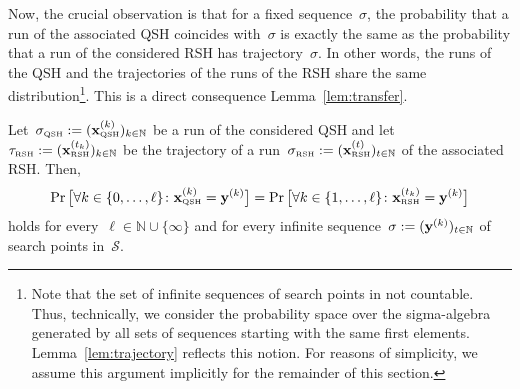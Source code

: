 \documentclass[a4paper,11pt]{article}
\begin{document}
Now, the crucial observation is that for a fixed sequence~$\sigma$, the probability that a run of the associated QSH coincides with~$\sigma$ is exactly the same as the probability that a run of the considered RSH has trajectory~$\sigma$. In other words, the runs of the QSH and the trajectories of the runs of the RSH share the same distribution\footnote{Note that the set of infinite sequences of search points in not countable. Thus, technically, we consider the probability space over the sigma-algebra generated by all sets of sequences starting with the same first elements. Lemma~\ref{lem:trajectory} reflects this notion. For reasons of simplicity, we assume this argument implicitly for the remainder of this section.}. This is a direct consequence Lemma~\ref{lem:transfer}. 

\begin{lemma}\label{lem:trajectory}
Let~$\sigma_\QSH:=(\xvec[k]_\QSH)_{k\in\mathbb{N}}$ be a run of the considered QSH and let~$\tau_\RSH:=(\xvec[t_k]_\RSH)_{k\in\mathbb{N}}$ be the trajectory of a run~$\sigma_\RSH:=(\xvec[t]_\RSH)_{t\in\mathbb{N}}$ of the associated RSH. Then,
\begin{equation*}
\Pr\big[\forall k\in\{0,\dots,\ell\}\colon\xvec[k]_\QSH=\yvec[k]\big]=\Pr\big[\forall k\in\{1,\dots,\ell\}\colon\xvec[t_k]_\RSH=\yvec[k]\big]
\end{equation*}
holds for every~$\ell\in\mathbb{N}\cup\{\infty\}$ and for every infinite sequence~$\sigma:=(\yvec[k])_{t\in\mathbb{N}}$ of search points in~$\mathcal{S}$.
\end{lemma}
\end{document}
